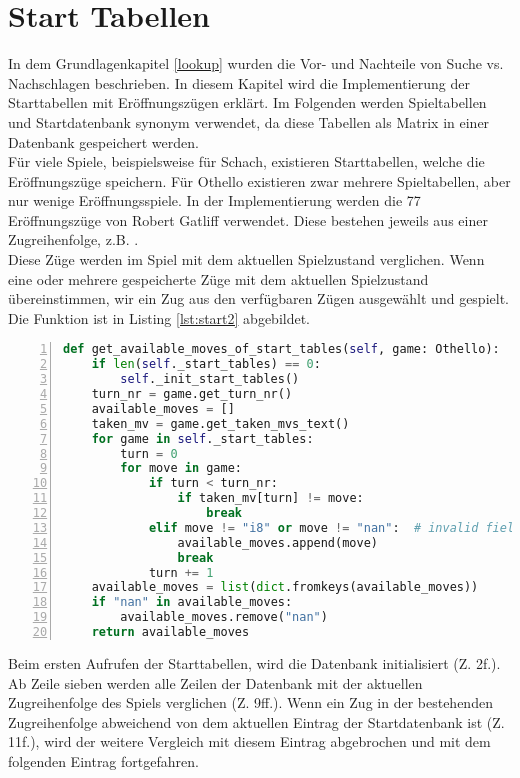\section{Start Tabellen}
In dem Grundlagenkapitel \ref{lookup} wurden die Vor- und Nachteile von Suche vs. Nachschlagen beschrieben. In diesem Kapitel wird die Implementierung der Starttabellen mit Eröffnungszügen erklärt. Im Folgenden werden Spieltabellen und Startdatenbank synonym verwendet, da diese Tabellen als Matrix in einer Datenbank gespeichert werden.
\\Für viele Spiele, beispielsweise für Schach, existieren Starttabellen, welche die  Eröffnungszüge speichern. Für Othello existieren zwar mehrere Spieltabellen, aber nur wenige Eröffnungsspiele. In der Implementierung werden die 77 Eröffnungszüge von Robert Gatliff \cite{open1} verwendet. Diese bestehen jeweils aus einer Zugreihenfolge, z.B. . 
\\Diese Züge werden im Spiel mit dem aktuellen Spielzustand verglichen. Wenn eine oder mehrere gespeicherte Züge mit dem aktuellen Spielzustand übereinstimmen, wir ein Zug aus den verfügbaren Zügen ausgewählt und gespielt. Die Funktion  ist in Listing \ref{lst:start2} abgebildet.
\begin{lstlisting}[basicstyle=\footnotesize, caption = {Befüllen der Datenbank 2}, language = python, captionpos = t , numbers=left, label={lst:start2}]
def get_available_moves_of_start_tables(self, game: Othello):
	if len(self._start_tables) == 0:
		self._init_start_tables()
	turn_nr = game.get_turn_nr()
	available_moves = []
	taken_mv = game.get_taken_mvs_text()
	for game in self._start_tables:
		turn = 0
		for move in game:
			if turn < turn_nr:
				if taken_mv[turn] != move:
					break
			elif move != "i8" or move != "nan":  # invalid field
				available_moves.append(move)
				break
			turn += 1
	available_moves = list(dict.fromkeys(available_moves))
	if "nan" in available_moves:
		available_moves.remove("nan")
	return available_moves
\end{lstlisting}
Beim ersten Aufrufen der Starttabellen, wird die Datenbank initialisiert (Z. 2f.). Ab Zeile sieben werden alle Zeilen der Datenbank mit der aktuellen Zugreihenfolge des Spiels verglichen (Z. 9ff.). Wenn ein Zug in der bestehenden Zugreihenfolge abweichend von dem aktuellen Eintrag der Startdatenbank ist (Z. 11f.), wird der weitere Vergleich mit diesem Eintrag abgebrochen und mit dem folgenden Eintrag fortgefahren.
